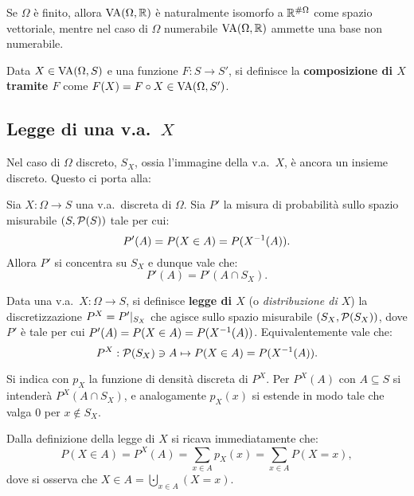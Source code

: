 \begin{multicols*}{2}
\begin{remark}
    Se $\Omega$ è finito, allora $\operatorname{VA}(\Omega, \mathbb{R})$ è naturalmente isomorfo
    a $\mathbb{R}^{\# \Omega}$ come spazio vettoriale, mentre
    nel caso di $\Omega$ numerabile $\operatorname{VA}(\Omega, \mathbb{R})$ ammette una base non numerabile.
\end{remark}

\begin{definition}
    Data $X \in \operatorname{VA}(\Omega, S)$ e una funzione $F : S \to S'$,
    si definisce la \textbf{composizione di $X$ tramite $F$}
    come $F(X) = F \circ X \in \operatorname{VA}(\Omega, S')$.
\end{definition}

\subsection{Legge di una v.a.~\texorpdfstring{$X$}{X}}

Nel caso di $\Omega$ discreto, $S_X$, ossia l'immagine della v.a.~$X$, è
ancora un insieme discreto. Questo ci porta alla:

\begin{proposition}
    Sia $X : \Omega \to S$ una v.a.~discreta di $\Omega$.
    Sia $P'$ la misura di probabilità sullo spazio misurabile
    $(S, \mathcal{P}(S))$ tale per cui:
    \[
        P'(A) = P(X \in A) = P(X^{-1}(A)).
    \]
    Allora $P'$ si concentra su $S_X$ e dunque vale che:
    \[
        P'(A) = P'(A \cap S_X).
    \]
\end{proposition}
    
\begin{definition}[Legge di $X$]
    Data una v.a.~$X : \Omega \to S$, si definisce \textbf{legge di $X$} (o \textit{distribuzione
    di $X$}) la discretizzazione $P^X = P'\arrowvert_{S_X}$ che
    agisce sullo spazio misurabile $(S_X, \mathcal{P}(S_X))$, dove
    $P'$ è tale per cui $P'(A) = P(X \in A) = P(X^{-1}(A))$.
    Equivalentemente vale che:
    \[
        P^X : \mathcal{P}(S_X) \ni A \mapsto P(X \in A) = P(X^{-1}(A)).
    \]


    Si indica con $p_X$ la funzione di densità discreta di $P^X$.
    Per $P^X(A)$ con $A \subseteq S$ si intenderà
    $P^X(A \cap S_X)$, e analogamente $p_X(x)$ si estende in modo
    tale che valga $0$ per $x \notin S_X$.
\end{definition}

\begin{remark}
    Dalla definizione della legge di $X$ si ricava immediatamente che:
    \[
        P(X \in A) = P^X(A) = \sum_{x \in A} p_X(x) = \sum_{x \in A} P(X = x),
    \]
    dove si osserva che $X \in A = \bigcupdot_{x \in A} (X = x)$.
\end{remark}


\end{multicols*}
